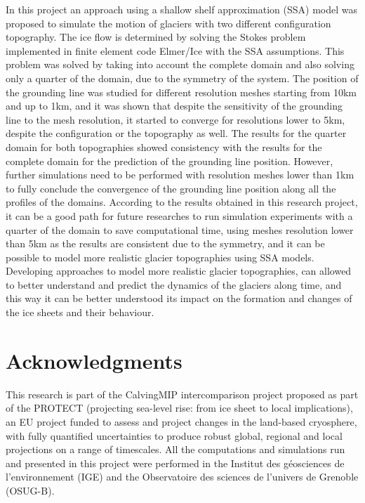 \documentclass{article}
\begin{document}
In this project an approach using a shallow shelf approximation (SSA) model was proposed to simulate the motion of glaciers with two different configuration topography. The ice flow is determined by solving the Stokes problem implemented in finite element code Elmer/Ice with the SSA assumptions. This problem was solved by taking into account the complete domain and also solving only a quarter of the domain, due to the symmetry of the system. The position of the grounding line was studied for different resolution meshes starting from 10km and up to 1km, and it was shown that despite the sensitivity of the grounding line to the mesh resolution, it started to converge for resolutions lower to 5km, despite the configuration or the topography as well. The results for the quarter domain for both topographies showed consistency with the results for the complete domain for the prediction of the grounding line position. However, further simulations need to be performed with resolution meshes lower than 1km to fully conclude the convergence of the grounding line position along all the profiles of the domains. According to the results obtained in this research project, it can be a good path for future researches to run simulation experiments with a quarter of the domain to save computational time, using meshes resolution lower than 5km as the results are consistent due to the symmetry, and it can be possible to model more realistic glacier topographies using SSA models. Developing approaches to model more realistic glacier topographies, can allowed to better understand and predict the dynamics of the glaciers along time, and this way it can be better understood its impact on the formation and changes of the ice sheets and their behaviour. 

\section{Acknowledgments} 

This research is part of the CalvingMIP intercomparison project proposed as part of the  PROTECT (projecting sea-level rise: from ice sheet to local implications), an EU project funded to assess and project changes in the land-based cryosphere, with fully quantified uncertainties to produce robust global, regional and local projections on a range of timescales. All the computations and simulations run and presented in this project were performed in the Institut des géosciences de l'environnement (IGE) and the Observatoire des sciences de l'univers de Grenoble (OSUG-B).

\pagebreak


\end{document}
